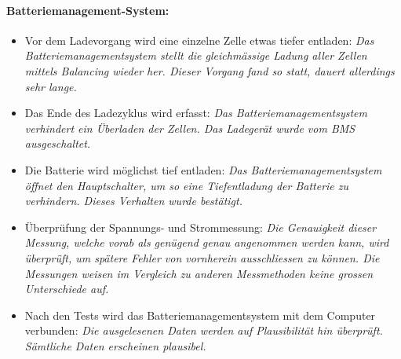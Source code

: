 \paragraph{Batteriemanagement-System:} \begin{itemize}
	\item Vor dem Ladevorgang wird eine einzelne Zelle etwas tiefer entladen: \textit{Das Batteriemanagementsystem stellt die gleichmässige Ladung aller Zellen mittels Balancing wieder her. Dieser Vorgang fand so statt, dauert allerdings sehr lange.}
	\item Das Ende des Ladezyklus wird erfasst: \textit{Das Batteriemanagementsystem verhindert ein Überladen der Zellen. Das Ladegerät wurde vom BMS ausgeschaltet.}
	\item Die Batterie wird möglichst tief entladen: \textit{Das Batteriemanagementsystem öffnet den Hauptschalter, um so eine Tiefentladung der Batterie zu verhindern. Dieses Verhalten wurde bestätigt.}
	\item Überprüfung der Spannungs- und Strommessung: \textit{Die Genauigkeit dieser Messung, welche vorab als genügend genau angenommen werden kann, wird überprüft, um spätere Fehler von vornherein ausschliessen zu können. Die Messungen weisen im Vergleich zu anderen Messmethoden keine grossen Unterschiede auf.}
	\item Nach den Tests wird das Batteriemanagementsystem mit dem Computer verbunden: \textit{Die ausgelesenen Daten werden auf Plausibilität hin überprüft. Sämtliche Daten erscheinen plausibel.}
\end{itemize}\color{black}


\newpage